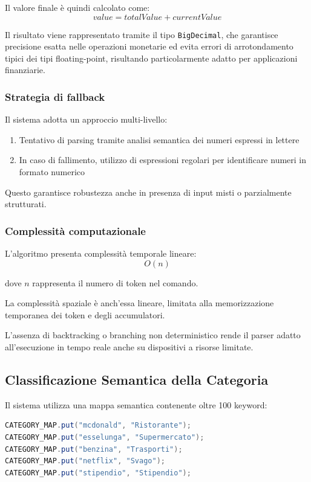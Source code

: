 \newpage
Il valore finale è quindi calcolato come:
\[
    value = totalValue + currentValue
\]

Il risultato viene rappresentato tramite il tipo \texttt{BigDecimal}, che garantisce precisione esatta nelle operazioni monetarie ed evita errori di arrotondamento tipici dei tipi floating-point, risultando particolarmente adatto per applicazioni finanziarie.

\subsubsection{Strategia di fallback}

Il sistema adotta un approccio multi-livello:

\begin{enumerate}
    \item Tentativo di parsing tramite analisi semantica dei numeri espressi in lettere
    \item In caso di fallimento, utilizzo di espressioni regolari per identificare numeri in formato numerico
\end{enumerate}

Questo garantisce robustezza anche in presenza di input misti o parzialmente strutturati.

\subsubsection{Complessità computazionale}

L'algoritmo presenta complessità temporale lineare:
\[
    O(n)
\]

dove $n$ rappresenta il numero di token nel comando.

La complessità spaziale è anch'essa lineare, limitata alla memorizzazione temporanea dei token e degli accumulatori.

L'assenza di backtracking o branching non deterministico rende il parser adatto all'esecuzione in tempo reale anche su dispositivi a risorse limitate.

\newpage
\subsection{Classificazione Semantica della Categoria}

Il sistema utilizza una mappa semantica contenente oltre 100 keyword:

\medskip

\begin{lstlisting}[language=Java]
CATEGORY_MAP.put("mcdonald", "Ristorante");
CATEGORY_MAP.put("esselunga", "Supermercato");
CATEGORY_MAP.put("benzina", "Trasporti");
CATEGORY_MAP.put("netflix", "Svago");
CATEGORY_MAP.put("stipendio", "Stipendio");
\end{lstlisting}

